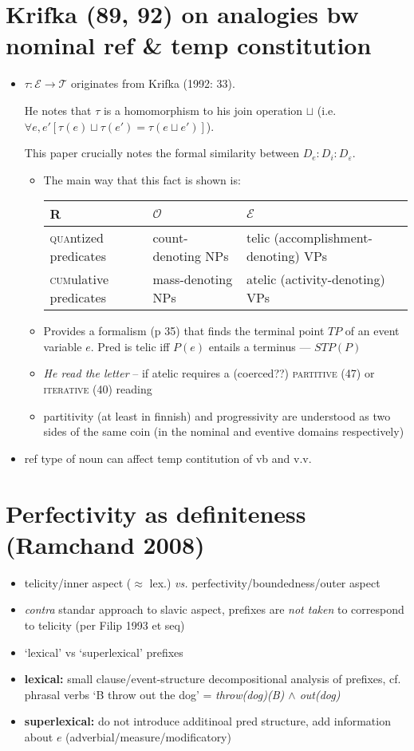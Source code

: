 \documentclass[10pt]{article}
\begin{document}
\section{Krifka (89, 92) on analogies bw nominal ref \& temp constitution}
\begin{itemize}
\item $ \tau:\mathcal E\to\mathcal T $ originates from Krifka (1992: 33).

He notes that $ \tau $ is a homomorphism to his join operation $ \sqcup $ (i.e. $ \forall e,e'[\tau(e)\sqcup\tau(e')=\tau(e\sqcup e')] $).

This paper crucially notes the formal similarity between $D_e:D_i:D_\varepsilon$. 
\begin{itemize}
\item The main way that this fact is shown is:


\begin{tabular}{l|ll}
	R & $ \mathcal O $ & $ \mathcal E $\\\midrule
	\textsc{qua}ntized predicates & count-denoting NPs & telic (accomplishment-denoting) VPs\\
	\textsc{cum}ulative predicates & mass-denoting NPs & atelic (activity-denoting) VPs\\
\end{tabular}
\item Provides a formalism (p 35) that finds the terminal point $ TP $ of an event variable $ e $. Pred is telic iff $ P(e) $ entails a terminus --- $ STP(P) $
\item \textit{He read the letter} -- if atelic requires a (coerced??) \textsc{partitive} (47) or \textsc{iterative} (40) reading 
\item partitivity (at least in finnish) and progressivity are understood as two sides of the same coin (in the nominal and eventive domains respectively)
\end{itemize}
\item ref type of noun can affect temp contitution of vb and v.v.
\end{itemize}

\section{Perfectivity as definiteness (Ramchand 2008)}

\begin{itemize}
\item telicity/inner aspect ($\approx$ lex.) \textit{vs.} perfectivity/boundedness/outer aspect
\item \textit{contra} standar approach to slavic aspect, prefixes are \textit{not taken} to correspond to telicity (per Filip 1993 et seq)
\item `lexical' vs `superlexical' prefixes
\item \textbf{lexical: }small clause/event-structure decompositional analysis of prefixes, cf. phrasal verbs `B throw out the dog' = \textit{throw(dog)(B) $ \wedge $ out(dog)}
\item \textbf{superlexical:} do not introduce additinoal pred structure, add information about $ e $ (adverbial/measure/modificatory)
\end{itemize}
\end{document}

